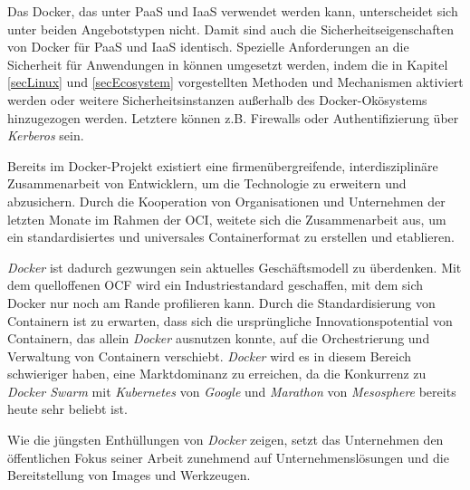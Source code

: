 \documentclass[../main.tex]{subfiles}
\begin{document}
  Das Docker, das unter PaaS und IaaS verwendet werden kann, unterscheidet sich unter beiden Angebotstypen nicht. Damit sind auch die Sicherheitseigenschaften von Docker für PaaS und IaaS identisch. Spezielle Anforderungen an die Sicherheit für Anwendungen in können umgesetzt werden, indem die in Kapitel \ref{secLinux} und \ref{secEcosystem} vorgestellten Methoden und Mechanismen aktiviert werden oder weitere Sicherheitsinstanzen außerhalb des Docker-Okösystems hinzugezogen werden. Letztere können z.B. Firewalls oder Authentifizierung über \emph{Kerberos} sein.





  Bereits im Docker-Projekt existiert eine firmenübergreifende, interdisziplinäre Zusammenarbeit von Entwicklern, um die Technologie zu erweitern und abzusichern. Durch die Kooperation von Organisationen und Unternehmen der letzten Monate im Rahmen der OCI, weitete sich die Zusammenarbeit aus, um ein standardisiertes und universales Containerformat zu erstellen und etablieren.

  \emph{Docker} ist dadurch gezwungen sein aktuelles Geschäftsmodell zu überdenken. Mit dem quelloffenen OCF wird ein Industriestandard geschaffen, mit dem sich Docker nur noch am Rande profilieren kann. Durch die Standardisierung von Containern ist zu erwarten, dass sich die ursprüngliche Innovationspotential von Containern, das allein \emph{Docker} ausnutzen konnte, auf die Orchestrierung und Verwaltung von Containern verschiebt. \emph{Docker} wird es in diesem Bereich schwieriger haben, eine Marktdominanz zu erreichen, da die Konkurrenz zu \emph{Docker Swarm} mit \emph{Kubernetes} von \emph{Google} und \emph{Marathon} von \emph{Mesosphere} bereits heute sehr beliebt ist.

  Wie die jüngsten Enthüllungen von \emph{Docker} zeigen, setzt das Unternehmen den öffentlichen Fokus seiner Arbeit zunehmend auf Unternehmenslösungen und die Bereitstellung von Images und Werkzeugen.
\end{document}
